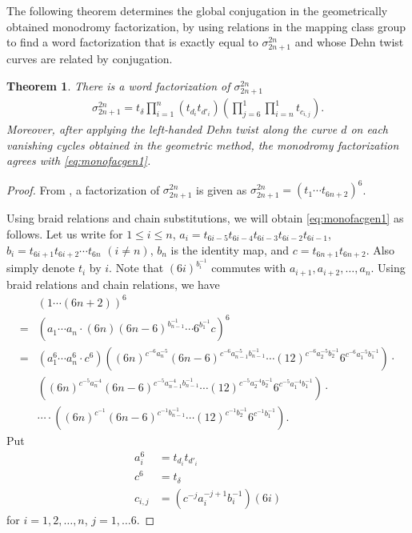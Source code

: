 \documentclass[10pt,a4paper,reqno]{amsart}
\newtheorem{thm}{Theorem}[section]
\theoremstyle{definition}
\numberwithin{equation}{section}
\numberwithin{figure}{section}
\begin{document}
The following theorem determines the global conjugation in the geometrically obtained monodromy factorization, by using relations in the mapping class group to find a word factorization that is exactly equal to $\sigma_{2n+1}^{2n}$ and whose Dehn twist curves are related by conjugation.

\begin{thm} \label{thm:comb_1}
There is a word factorization of $\sigma_{2n+1}^{2n}$
\begin{align} \label{eq:monofacgen1}
\sigma_{2n+1}^{2n}=t_{\delta} \prod_{i=1}^n (t_{d_i} t_{d'_i}) \left(\prod_{j=6}^1 \prod_{i=n}^1 t_{c_{i,j}} \right) .
\end{align}
Moreover, after applying the left-handed Dehn twist along the curve $d$ on each vanishing cycles obtained in the geometric method,
the monodromy factorization agrees with \eqref{eq:monofacgen1}.
\end{thm}

\begin{proof}
From \cite{I}, a factorization of $\sigma_{2n+1}^{2n}$ is given as $\sigma_{2n+1}^{2n}=(t_1\cdots t_{6n+2})^6$.

Using braid relations and chain substitutions, we will obtain \eqref{eq:monofacgen1} as follows.
Let us write for $1\le i\le n$, $a_i=t_{6i-5} t_{6i-4} t_{6i-3} t_{6i-2} t_{6i-1}$, $b_i=t_{6i+1} t_{6i+2} \cdots t_{6n}$ $(i\neq n)$, $b_n$ is the identity map, 
and $c=t_{6n+1} t_{6n+2}$.
Also simply denote $t_i$ by $i$.
Note that $(6i)^{b_i^{-1}}$ commutes with $a_{i+1}, a_{i+2},\dots, a_{n}$.
Using braid relations and chain relations, we have
\begin{align*}
&(1\cdots (6n+2))^6 \\
=&(a_1 \cdots a_n \cdot (6n) (6n-6)^{b_{n-1}^{-1}} \cdots 6^{b_1^{-1}} c)^6 \\
=& (a_1^6 \cdots a_n^6 \cdot c^6) ((6n)^{c^{-6} a_n^{-5}} (6n-6)^{c^{-6}a_{n-1}^{-5} b_{n-1}^{-1}} \cdots (12)^{c^{-6} a_2^{-5}b_2^{-1}} 6^{c^{-6} a_1^{-5} b_1^{-1}}) \cdot \\
&((6n)^{c^{-5}a_n^{-4}} (6n-6)^{c^{-5}a_{n-1}^{-4}  b_{n-1}^{-1}} \cdots (12)^{c^{-5}a_2^{-4} b_2^{-1}} 6^{c^{-5}a_1^{-4}  b_1^{-1}}) \cdot \\
&\cdots \cdot ((6n)^{c^{-1}} (6n-6)^{c^{-1} b_{n-1}^{-1}} \cdots (12)^{c^{-1} b_2^{-1}} 6^{c^{-1} b_1^{-1}}) .
\end{align*}
Put 
\begin{equation}\label{eq:vc_comb1}
\begin{aligned}
a_i^6&=t_{d_i} t_{d'_i}\\
c^6&=t_{\delta}\\
c_{i,j}&=(c^{-j}a_{i}^{-j+1}b_{i}^{-1})(6i)
\end{aligned}
\end{equation}
for $i=1,2,\dots, n$, $j=1,\dots 6$.
\end{proof}
\end{document}
